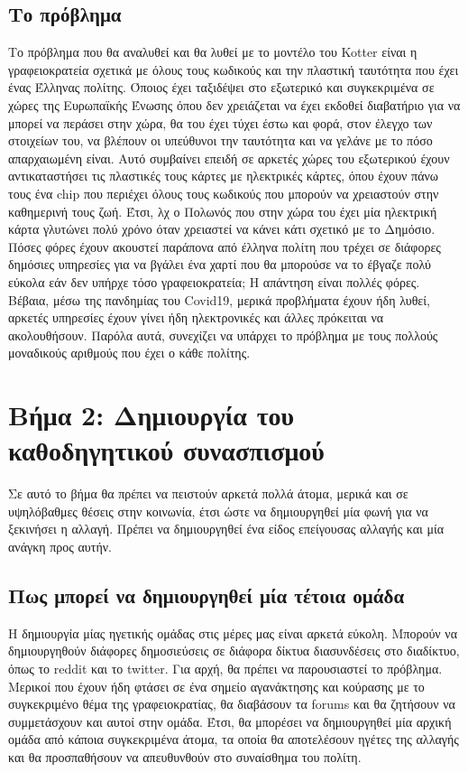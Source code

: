 \documentclass{fphw}
\begin{document}
    \subsection*{Το πρόβλημα}
    Το πρόβλημα που θα αναλυθεί και θα λυθεί με το μοντέλο του Kotter είναι
    η γραφειοκρατεία σχετικά με όλους τους κωδικούς και την πλαστική ταυτότητα που έχει ένας Έλληνας πολίτης.
    Όποιος έχει ταξιδέψει στο εξωτερικό και συγκεκριμένα σε χώρες της Ευρωπαϊκής Ένωσης
    όπου δεν χρειάζεται να έχει εκδοθεί διαβατήριο για να μπορεί να περάσει στην χώρα,
    θα του έχει τύχει έστω και φορά, στον έλεγχο των στοιχείων του, να βλέπουν οι υπεύθυνοι
    την ταυτότητα και να γελάνε με το πόσο απαρχαιωμένη είναι. Αυτό συμβαίνει επειδή σε αρκετές 
    χώρες του εξωτερικού έχουν αντικαταστήσει τις πλαστικές τους κάρτες με ηλεκτρικές κάρτες, 
    όπου έχουν πάνω τους ένα chip που περιέχει όλους τους κωδικούς που μπορούν να χρειαστούν στην
    καθημερινή τους ζωή. Έτσι, λχ ο Πολωνός που στην χώρα του έχει μία ηλεκτρική κάρτα γλυτώνει πολύ χρόνο
    όταν χρειαστεί να κάνει κάτι σχετικό με το Δημόσιο. Πόσες φόρες έχουν ακουστεί παράπονα από έλληνα πολίτη που τρέχει
    σε διάφορες δημόσιες υπηρεσίες για να βγάλει ένα χαρτί που θα μπορούσε να το έβγαζε πολύ εύκολα εάν
    δεν υπήρχε τόσο γραφειοκρατεία; Η απάντηση είναι πολλές φόρες. Βέβαια, μέσω της πανδημίας του Covid19, μερικά
    προβλήματα έχουν ήδη λυθεί, αρκετές υπηρεσίες έχουν γίνει ήδη ηλεκτρονικές και άλλες πρόκειται να ακολουθήσουν.
    Παρόλα αυτά, συνεχίζει να υπάρχει το πρόβλημα με τους πολλούς μοναδικούς αριθμούς που έχει ο κάθε πολίτης.

    \newpage
    \section*{Βήμα 2: Δημιουργία του καθοδηγητικού συνασπισμού}

    \begin{problem}
        Σε αυτό το βήμα θα πρέπει να πειστούν αρκετά πολλά άτομα, μερικά και σε υψηλόβαθμες θέσεις στην κοινωνία, 
        έτσι ώστε να δημιουργηθεί μία φωνή για να ξεκινήσει η αλλαγή. Πρέπει να δημιουργηθεί ένα είδος επείγουσας αλλαγής
        και μία ανάγκη προς αυτήν.
    \end{problem}

    \subsection*{Πως μπορεί να δημιουργηθεί μία τέτοια ομάδα}
    Η δημιουργία μίας ηγετικής ομάδας στις μέρες μας είναι αρκετά εύκολη. Μπορούν να δημιουργηθούν διάφορες 
    δημοσιεύσεις σε διάφορα δίκτυα διασυνδέσεις στο διαδίκτυο, όπως το reddit και το twitter.
    Για αρχή, θα πρέπει να παρουσιαστεί το πρόβλημα. Μερικοί που έχουν ήδη φτάσει σε ένα σημείο αγανάκτησης και κούρασης
    με το συγκεκριμένο θέμα της γραφειοκρατίας, θα διαβάσουν τα forums και θα ζητήσουν να συμμετάσχουν και αυτοί στην ομάδα. 
    Έτσι, θα μπορέσει να δημιουργηθεί μία αρχική ομάδα από κάποια συγκεκριμένα άτομα, 
    τα οποία θα αποτελέσουν ηγέτες της αλλαγής και θα προσπαθήσουν να απευθυνθούν στο συναίσθημα του πολίτη.
\end{document}
